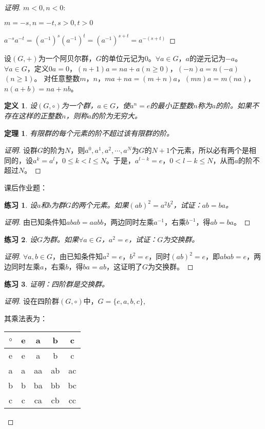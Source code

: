 \documentclass{article}
\newtheorem{Def}{定义}
\newtheorem{Thm}{定理}
\newtheorem{Exercise}{练习}
\begin{document}
\begin{CJK*}{UTF8}{gbsn}
\begin{proof}[证明]
  $m<0, n<0:$
  
  $m=-s,n=-t, s>0,t>0$
  
  $a^{-s}a^{-t}=(a^{-1})^s(a^{-1})^t=(a^{-1})^{s+t}=a^{-(s+t)}$
  \end{proof}
  设$(G,+)$为一个阿贝尔群，$G$的单位元记为$0$。$\forall a\in G$，$a$的逆元记为$-a$。$\forall a\in G$，定义$0a=0$，$(n+1)a=na+a$$(n\geq 0)$，$(-n)a=n(-a)$$(n\geq 1)$。
  对任意整数$m$，$n$，$ma+na=(m+n)a$，$(mn)a=m(na)$，$n(a+b)=na+nb$。
  \begin{Def}
    设$(G,\circ)$为一个群，$a\in G$，使$a^n=e$的最小正整数$n$称为$a$的阶。如果不存在这样的正整数$n$，则称$a$的阶为无穷大。
  \end{Def}
  \begin{Thm}
    有限群的每个元素的阶不超过该有限群的阶。
  \end{Thm}
  \begin{proof}[证明]
    设群$G$的阶为$N$，则$a^0,a^1,a^2,\cdots,a^N$为$G$的$N+1$个元素，所以必有两个是相同的，设$a^k=a^l$，$0\leq k<l\leq N$。于是，$a^{l-k}=e$，$0<l-k\leq N$，从而$a$的阶不超过$N$。
  \end{proof}


课后作业题：

\begin{Exercise}
  设$a$和$b$为群$G$的两个元素。如果$(ab)^2=a^2b^2$，试证：$ab=ba$。
\end{Exercise}
\begin{proof}[证明]
  由已知条件知$abab=aabb$，两边同时左乘$a^{-1}$，右乘$b^{-1}$，得$ab=ba$。
\end{proof}
\begin{Exercise}
  设$G$为群。如果$\forall a\in G$，$a^2=e$，试证：$G$为交换群。
\end{Exercise}
\begin{proof}[证明]
  $\forall a,b\in G$，由已知条件知$a^2=e$，$b^2=e$，同时$(ab)^2=e$，即$abab=e$，两边同时左乘$a$，右乘$b$，得$ba=ab$，这证明了$G$为交换群。
\end{proof}
\begin{Exercise}
  证明：四阶群是交换群。
\end{Exercise}
\begin{proof}[证明]
  设在四阶群$(G,\circ)$中，$G=\{e,a,b,c\}$,

  其乘法表为：

\begin{tabular}{c|cccc}
  $\circ$&e&a&b&c\\
  \hline
e&e&a&b&c\\
a&a&aa&ab&ac\\
b&b&ba&bb&bc\\
c&c&ca&cb&cc\\
\end{tabular}


\end{proof}
\end{CJK*}
\end{document}
